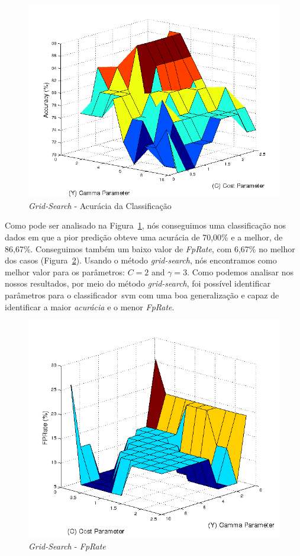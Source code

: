\begin{figure}[!h]
 \centering
  \includegraphics[scale=0.7]{./img/gridsearch.png} 
  \caption{\textit{Grid-Search} - Acurácia da Classificação}
 \label{fig:gridaccuracy}
\end{figure}

 
Como pode ser analisado na Figura~\ref{fig:gridaccuracy}, nós conseguimos uma classificação nos dados em que a pior predição obteve uma acurácia de 70,00\% e a melhor, de 86,67\%. Conseguimos também um baixo valor de \textit{FpRate}, com 6,67\% no melhor dos casos (Figura~\ref{fig:gridfprate}). Usando o método \textit{grid-search}, nós encontramos como melhor valor para os parâmetros: $C = 2$ and $\gamma = 3$. Como podemos analisar nos nossos resultados, por meio do método \textit{grid-search}, foi possível identificar parâmetros para o classificador~\ac{svm} com uma boa generalização e capaz de identificar a maior \textit{acurácia} e o menor \textit{FpRate}.


\begin{figure}[!h]
 \centering
 \includegraphics[scale=0.7]{./img/gridsearchfprate.png}
\caption{\textit{Grid-Search} - \textit{FpRate}}
 \label{fig:gridfprate}
\end{figure}


